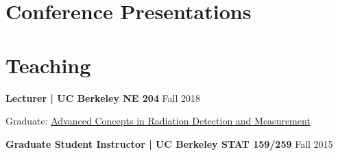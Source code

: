 \documentclass[margin,line]{res}
\let\resumesection\section
\newenvironment{list1}{
  \begin{list}{\ding{113}}{%
      \setlength{\itemsep}{0in}
      \setlength{\parsep}{0in} \setlength{\parskip}{0in}
      \setlength{\topsep}{0in} \setlength{\partopsep}{0in} 
      \setlength{\leftmargin}{0.17in}}}{\end{list}}
\begin{document}
\begin{resume}
\section{\sc Conference Presentations}

\renewcommand{\section}[2]{}
\renewcommand{\section}{\resumesection}

%

\section{\sc Teaching\footnotemark}

{\bf Lecturer | UC Berkeley NE 204} \hfill Fall 2018

\begin{list1}
\item[] Graduate: 
        \href{http://ne204-fall2018.github.io}
             {Advanced Concepts in Radiation Detection and Measurement}
\end{list1}

{\bf Graduate Student Instructor | UC Berkeley STAT 159/259} \hfill Fall 2015 


\end{resume}
\end{document}

